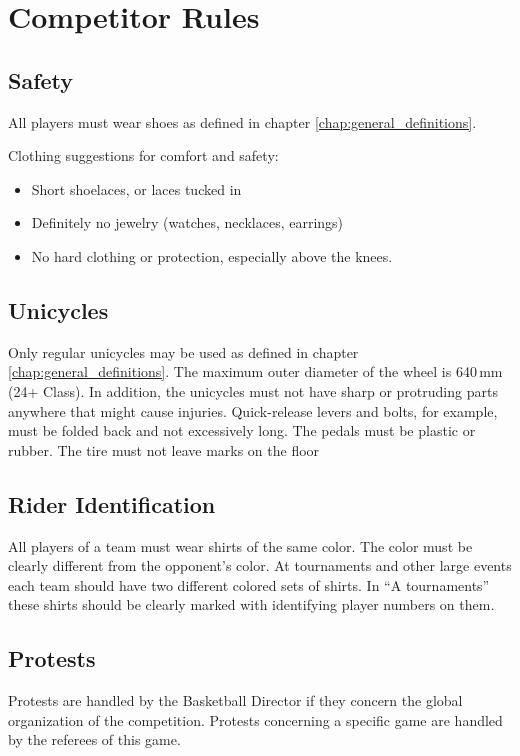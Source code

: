 \chapter{Competitor Rules}

\section{Safety}

All players must wear shoes as defined in chapter \ref{chap:general_definitions}.

Clothing suggestions for comfort and safety:
\begin{itemize}
\item Short shoelaces, or laces tucked in
\item Definitely no jewelry (watches, necklaces, earrings)
\item No hard clothing or protection, especially above the knees.
\end{itemize}

\section{Unicycles}

Only regular unicycles may be used as defined in chapter \ref{chap:general_definitions}.
The maximum outer diameter of the wheel is 640\,mm (24+ Class).
In addition, the unicycles must not have sharp or protruding parts anywhere that might cause injuries.
Quick-release levers and bolts, for example, must be folded back and not excessively long.
The pedals must be plastic or rubber.
The tire must not leave marks on the floor

\section{Rider Identification}

All players of a team must wear shirts of the same color.
The color must be clearly different from the opponent's color.
At tournaments and other large events each team should have two different colored sets of shirts. In ``A tournaments'' these shirts should be clearly marked with identifying player numbers on them.

\section{Protests}
Protests are handled by the Basketball Director if they concern the global organization of the competition.
Protests concerning a specific game are handled by the referees of this game.

